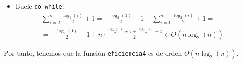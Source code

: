 \begin{ejercicio}
\begin{enumerate}[label=\alph*)]
\begin{itemize}
                \item Bucle \verb|do-while|:
                \begin{multline*}
                    \sum_{i=2}^{n} \frac{\log_2(i)}{2}+1
                    = -\frac{\log_2(1)}{2}-1 + \sum_{i=1}^{n} \frac{\log_2(i)}{2}+1 
                    =\\= -\frac{\log_2(1)}{2}-1 + n\cdot \frac{\frac{\log_2(1)}{2}+1 + \frac{\log_2(n)}{2}+1}{2}
                    \in O(n\log_2(n))
                \end{multline*}
            \end{itemize}
            
            Por tanto, tenemos que la función \verb|eficiencia4| es de orden $O(n\log_2(n))$.
    \end{enumerate}
\end{ejercicio}



